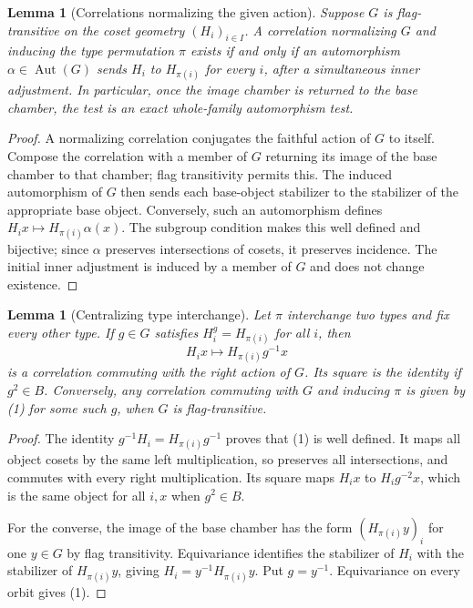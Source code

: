 \documentclass[11pt,a4paper]{article}
\newtheorem{lemma}[theorem]{Lemma}
\newcommand{\Aut}{\operatorname{Aut}}
\begin{document}
\begin{lemma}[Correlations normalizing the given action]\label{normalizing}
Suppose $G$ is flag-transitive on the coset geometry $(H_i)_{i\in I}$.
A correlation normalizing $G$ and inducing the type permutation $\pi$
exists if and only if an automorphism $\alpha\in\Aut(G)$ sends
$H_i$ to $H_{\pi(i)}$ for every $i$, after a simultaneous inner
adjustment. In particular, once the image chamber is returned to the
base chamber, the test is an exact whole-family automorphism test.
\end{lemma}
\begin{proof}
A normalizing correlation conjugates the faithful action of $G$ to
itself. Compose the correlation with a member of $G$ returning its
image of the base chamber to that chamber; flag transitivity permits
this. The induced automorphism of $G$ then sends each base-object
stabilizer to the stabilizer of the appropriate base object. Conversely,
such an automorphism defines $H_ix\mapsto H_{\pi(i)}\alpha(x)$.
The subgroup condition makes this well defined and bijective; since
$\alpha$ preserves intersections of cosets, it preserves incidence.
The initial inner adjustment is induced by a member of $G$ and does
not change existence.
\end{proof}

\begin{lemma}[Centralizing type interchange]\label{centralizing}
Let $\pi$ interchange two types and fix every other type. If $g\in G$
satisfies $H_i^g=H_{\pi(i)}$ for all $i$, then
\[
       H_ix\longmapsto H_{\pi(i)}g^{-1}x                         \tag{1}
\]
is a correlation commuting with the right action of $G$. Its square
is the identity if $g^2\in B$. Conversely, any correlation commuting
with $G$ and inducing $\pi$ is given by (1) for some such $g$, when
$G$ is flag-transitive.
\end{lemma}
\begin{proof}
The identity $g^{-1}H_i=H_{\pi(i)}g^{-1}$ proves that (1) is well
defined. It maps all object cosets by the same left multiplication,
so preserves all intersections, and commutes with every right
multiplication. Its square maps $H_ix$ to $H_ig^{-2}x$, which is the
same object for all $i,x$ when $g^2\in B$.

For the converse, the image of the base chamber has the form
$(H_{\pi(i)}y)_i$ for one $y\in G$ by flag transitivity.
Equivariance identifies the stabilizer of $H_i$ with the stabilizer
of $H_{\pi(i)}y$, giving $H_i=y^{-1}H_{\pi(i)}y$.
Put $g=y^{-1}$. Equivariance on every orbit gives (1).
\end{proof}
\end{document}
